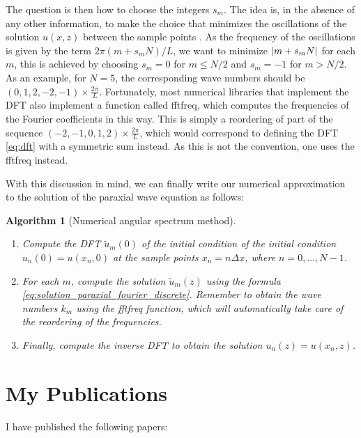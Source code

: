 \documentclass[a4paper,10pt]{report}
\newtheorem{alg}{Algorithm}
\begin{document}
The question is then how to choose the integers $s_m$. The idea is, in the absence of any other information, to make the choice that minimizes the oscillations of the solution $u(x,z)$ between the sample points \cite{fftderiv}. As the frequency of the oscillations is given by the term $2\pi (m + s_m N) / L$, we want to minimize $\abs{m + s_m N}$ for each $m$, this is achieved by choosing $s_m = 0$ for $m \le N/2$ and $s_m = -1$ for $m > N/2$. As an example, for $N = 5$, the corresponding wave numbers should be $(0, 1, 2, -2, -1) \times \frac{2\pi}{L}$. Fortunately, most numerical libraries that implement the DFT also implement a function called fftfreq, which computes the frequencies of the Fourier coefficients in this way. This is simply a reordering of part of the sequence $(-2, -1, 0, 1, 2) \times \frac{2\pi}{L}$, which would correspond to defining the DFT \eqref{eq:dft} with a symmetric sum instead. As this is not the convention, one uses the fftfreq instead. 

With this discussion in mind, we can finally write our numerical approximation to the solution of the paraxial wave equation as follows:
\begin{alg}[Numerical angular spectrum method]
\leavevmode
\begin{enumerate}
    \item Compute the DFT $\tilde{u}_m(0)$ of the initial condition of the initial condition $u_n(0) = u(x_n,0)$ at the sample points $x_n = n \Delta x$, where $n = 0, \ldots, N-1$.
    \item For each $m$, compute the solution $\tilde{u}_m(z)$ using the formula \eqref{eq:solution_paraxial_fourier_discrete}. Remember to obtain the wave numbers $k_m$ using the fftfreq function, which will automatically take care of the reordering of the frequencies.
    \item Finally, compute the inverse DFT to obtain the solution $u_n(z) = u(x_n,z)$.
\end{enumerate}
\end{alg}

\chapter{My Publications}

I have published the following papers: \cite{PhysRevA.108.013503, DEOLIVEIRA2024110983, 48bj-bm8b}



\end{document}
